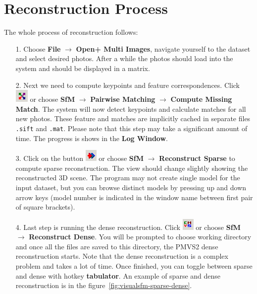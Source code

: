 \section{Reconstruction Process}
The whole process of reconstruction follows:
\begin{itemize}
	\item[1.] Choose \textbf{File} $\rightarrow$ \textbf{Open+ Multi Images}, navigate yourself to the dataset and select desired photos. After a while the photos should load into the system and should be displayed in a matrix.
	\item[2.] Next we need to compute keypoints and feature correspondences. Click \includegraphics[keepaspectratio,width=.5cm]{fig/visualsfm-compute-matches.png} or choose \textbf{SfM} $\rightarrow$ \textbf{Pairwise Matching} $\rightarrow$ \textbf{Compute Missing Match}. The system will now detect keypoints and calculate matches for all new photos. These feature and matches are implicitly cached in separate files \texttt{.sift} and \texttt{.mat}. Please note that this step may take a significant amount of time. The progress is shows in the \textbf{Log Window}.
	\item[3.] Click on the button \includegraphics[keepaspectratio,width=.5cm]{fig/visualsfm-sparse-reconstruction.png} or choose \textbf{SfM} $\rightarrow$ \textbf{Reconstruct Sparse} to compute sparse reconstruction. The view should change slightly showing the reconstructed 3D scene. The program may not create single model for the input dataset, but you can browse distinct models by pressing up and down arrow keys (model number is indicated in the window name between first pair of square brackets).
	\item[4.] Last step is running the dense reconstruction. Click \includegraphics[keepaspectratio,width=.5cm]{fig/visualsfm-dense-reconstruction.png} or choose \textbf{SfM} $\rightarrow$ \textbf{Reconstruct Dense}. You will be prompted to choose working directory and once all the files are saved to this directory, the PMVS2 dense reconstruction starts. Note that the dense reconstruction is a complex problem and takes a lot of time. Once finished, you can toggle between sparse and dense with hotkey \textbf{tabulator}. An example of sparse and dense reconstruction is in the figure~\ref{fig:visualsfm-sparse-dense}.
\end{itemize}
